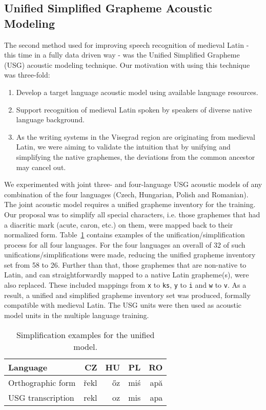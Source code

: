 \documentclass[runningheads,a4paper]{llncs}
\begin{document}
\subsection{Unified Simplified Grapheme Acoustic Modeling}\label{usg}
The second method used for improving speech recognition of medieval Latin - this time in a fully data driven way - was the Unified Simplified Grapheme (USG) acoustic modeling technique.
Our motivation with using this technique was three-fold:
\begin{enumerate}
\item Develop a target language acoustic model using available language resources.
\item Support recognition of medieval Latin spoken by speakers of diverse native language background.
\item As the writing systems in the Visegrad region are originating from medieval Latin, we were aiming to validate the intuition that by unifying and simplifying the native graphemes, the deviations from the common ancestor may cancel out.
\end{enumerate}
We experimented with joint three- and four-language USG acoustic models of any combination of the four languages (Czech, Hungarian, Polish and Romanian). 
The joint acoustic model requires a unified grapheme inventory for the training.
Our proposal was to simplify all special characters, i.e. those graphemes that had a diacritic mark (acute, caron, etc.) on them, were mapped back to their normalized form.
Table~\ref{tbl:usg-examples} contains examples of the unification/simplification process for all four languages.
For the four languages an overall of 32 of such unifications/simplifications were made, reducing the unified grapheme inventory set from 58 to 26.
Further than that, those graphemes that are non-native to Latin, and can straightforwardly mapped to a native Latin grapheme(s), were also replaced.
These included mappings from \texttt{x} to \texttt{ks}, \texttt{y} to \texttt{i} and \texttt{w} to \texttt{v}.
As a result, a unified and simplified grapheme inventory set was produced, formally compatible with medieval Latin.
The USG units were then used as acoustic model units in the multiple language training.

\begin{table}
	\centering
	\caption{Simplification examples for the unified model.}\label{tbl:usg-examples}
	\begin{tabular}{l|rrrr}
	\hline
	Language & CZ & HU & PL & RO \\
	\hline
	Orthographic form & \v{r}ekl & \H{o}z & mi\'{s} & ap\u{a} \\
	USG transcription & rekl & oz & mis & apa \\
	\hline
	\end{tabular}
\end{table}
\end{document}
